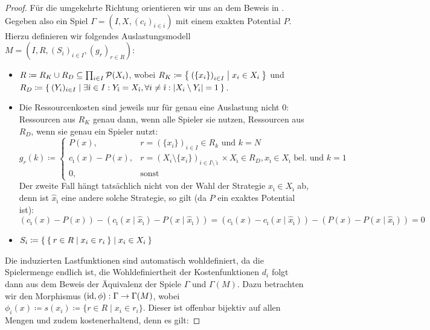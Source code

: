 \begin{proof}
		
	Für die umgekehrte Richtung orientieren wir uns an dem Beweis in \cite[Theorem 1]{MultiPotGames}. Gegeben also ein Spiel $\Gamma = (I, X, (c_i)_{i\in i})$ mit einem exakten Potential $P$. Hierzu definieren wir folgendes Auslastungsmodell $M = (I, R, (S_i)_{i \in I}, (g_r)_{r \in R})$:
	\begin{itemize}
		\item $R \coloneqq R_K \cup R_D \subseteq \prod_{i \in I}\mathcal{P}(X_i)$, wobei $R_K \coloneqq \Set{\left(\{x_i\}\right)_{i \in I} | x_i \in X_i }$ und \\ $R_D \coloneqq \Set{(Y_i)_{i \in I} | \exists \hat{\imath} \in I: Y_{\hat{\imath}} = X_{\hat{\imath}}, \forall i \neq \hat{\imath}: \left|X_i \setminus Y_i\right| = 1 }$.
		\item Die Ressourcenkosten sind jeweils nur für genau eine Auslastung nicht $0$: Ressourcen aus $R_K$ genau dann, wenn alle Spieler sie nutzen, Ressourcen aus $R_D$, wenn sie genau ein Spieler nutzt:
				\[g_r(k) \coloneqq 
					\begin{cases}
						P(x), 					&r = \left(\{x_i\}\right)_{i \in I} \in R_k 													\text{ und } k=N \\
						c_{\hat{\imath}}(x) - P(x), 	&r = \left(X_i\setminus\{x_i\}\right)_{i \in I\setminus\hat{\imath}} \times X_{\hat{\imath}} \in R_D, x_{\hat{\imath}} \in X_{\hat{\imath}} \text{ bel. und } k=1 \\
						0,						&\text{sonst}
					\end{cases}
				\]
			Der zweite Fall hängt tatsächlich nicht von der Wahl der Strategie $x_{\hat{\imath}} \in X_{\hat{\imath}}$ ab, denn ist $\hat{x}_{\hat{\imath}}$ eine andere solche Strategie, so gilt (da $P$ ein exaktes Potential ist):
			\[\left(c_{\hat{\imath}}(x) - P(x)\right) - \left(c_{\hat{\imath}}(x \mid \hat{x}_{\hat{\imath}}) - P(x \mid \hat{x}_{\hat{\imath}})\right) = \left(c_{\hat{\imath}}(x) - c_{\hat{\imath}}(x \mid \hat{x}_{\hat{\imath}})\right) - \left(P(x) - P(x \mid \hat{x}_{\hat{\imath}})\right) = 0\]
		\item $S_i \coloneqq \Set{ \Set{r \in R | x_i \in r_i} | x_i \in X_i }$
	\end{itemize}
	Die induzierten Lastfunktionen sind automatisch wohldefiniert, da die Spielermenge endlich ist, die Wohldefiniertheit der Kostenfunktionen $d_i$ folgt dann aus dem Beweis der Äquivalenz der Spiele $\Gamma$ und $\Gamma(M)$. Dazu betrachten wir den Morphismus $(\mathrm{id}, \phi): \Gamma \to \Gamma(M)$, wobei $\phi_i(x) \coloneqq s(x_i) \coloneqq \{r \in R \mid x_i \in r_i\}$. Dieser ist offenbar bijektiv auf allen Mengen und zudem kostenerhaltend, denn es gilt:

\end{proof}

